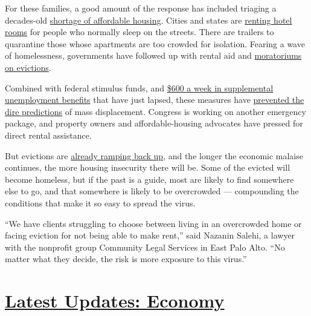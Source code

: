 For these families, a good amount of the response has included triaging
a decades-old
\href{https://reports.nlihc.org/gap\#:~:text=The\%20U.S.\%20has\%20a\%20shortage,extremely\%20low\%2Dincome\%20renter\%20households.}{shortage
of affordable housing}. Cities and states are
\href{https://www.kqed.org/news/11825653/california-found-hotels-for-10000-homeless-residents-what-next}{renting
hotel rooms} for people who normally sleep on the streets. There are
trailers to quarantine those whose apartments are too crowded for
isolation. Fearing a wave of homelessness, governments have followed up
with rental aid and
\href{https://evictionlab.org/covid-policy-scorecard/}{moratoriums on
evictions}.

Combined with federal stimulus funds, and
\href{https://www.nytimes.com/2020/07/29/business/economy/unemployment-benefits-coronavirus.html}{\$600
a week in supplemental unemployment benefits} that have just lapsed,
these measures have
\href{https://www.nytimes.com/2020/05/31/business/economy/coronavirus-rent-landlords-tenants.html}{prevented
the dire predictions} of mass displacement. Congress is working on
another emergency package, and property owners and affordable-housing
advocates have pressed for direct rental assistance.

But evictions are
\href{https://www.nytimes.com/2020/07/23/business/evictions-moratorium-cares-act.html}{already
ramping back up}, and the longer the economic malaise continues, the
more housing insecurity there will be. Some of the evicted will become
homeless, but if the past is a guide, most are likely to find somewhere
else to go, and that somewhere is likely to be overcrowded ---
compounding the conditions that make it so easy to spread the virus.

``We have clients struggling to choose between living in an overcrowded
home or facing eviction for not being able to make rent,'' said Nazanin
Salehi, a lawyer with the nonprofit group Community Legal Services in
East Palo Alto. ``No matter what they decide, the risk is more exposure
to this virus.''

\hypertarget{latest-updates-economy}{%
\section{\texorpdfstring{\href{https://www.nytimes.com/live/2020/07/31/business/stock-market-today-coronavirus?action=click\&pgtype=Article\&state=default\&region=MAIN_CONTENT_1\&context=storylines_live_updates}{Latest
Updates:
Economy}}{Latest Updates: Economy}}\label{latest-updates-economy}}

